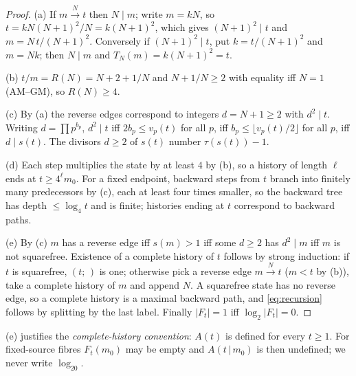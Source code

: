 \begin{proof}
(a) If $m\xrightarrow{N}t$ then $N\mid m$; write $m=kN$, so $t=kN(N{+}1)^2/N=k(N{+}1)^2$, which gives $(N{+}1)^2\mid t$ and $m=N\,t/(N{+}1)^2$. Conversely if $(N{+}1)^2\mid t$, put $k=t/(N{+}1)^2$ and $m=Nk$; then $N\mid m$ and $T_N(m)=k(N{+}1)^2=t$.

(b) $t/m=R(N)=N+2+1/N$ and $N+1/N\ge2$ with equality iff $N=1$ (AM--GM), so $R(N)\ge4$.

(c) By (a) the reverse edges correspond to integers $d=N{+}1\ge2$ with $d^2\mid t$. Writing $d=\prod p^{b_p}$, $d^2\mid t$ iff $2b_p\le v_p(t)$ for all $p$, iff $b_p\le\lfloor v_p(t)/2\rfloor$ for all $p$, iff $d\mid s(t)$. The divisors $d\ge2$ of $s(t)$ number $\tau(s(t))-1$.

(d) Each step multiplies the state by at least $4$ by (b), so a history of length $\ell$ ends at $t\ge4^\ell m_0$. For a fixed endpoint, backward steps from $t$ branch into finitely many predecessors by (c), each at least four times smaller, so the backward tree has depth $\le\log_4 t$ and is finite; histories ending at $t$ correspond to backward paths.

(e) By (c) $m$ has a reverse edge iff $s(m)>1$ iff some $d\ge2$ has $d^2\mid m$ iff $m$ is not squarefree. Existence of a complete history of $t$ follows by strong induction: if $t$ is squarefree, $(t;\,)$ is one; otherwise pick a reverse edge $m\xrightarrow{N}t$ ($m<t$ by (b)), take a complete history of $m$ and append $N$. A squarefree state has no reverse edge, so a complete history is a maximal backward path, and \eqref{eq:recursion} follows by splitting by the last label. Finally $|F_t|=1$ iff $\log_2|F_t|=0$.
\end{proof}

\begin{remark}
(e) justifies the \emph{complete-history convention}: $A(t)$ is defined for every $t\ge1$. For fixed-source fibres $F_t(m_0)$ may be empty and $A(t\,|\,m_0)$ is then undefined; we never write $\log_20$.
\end{remark}

